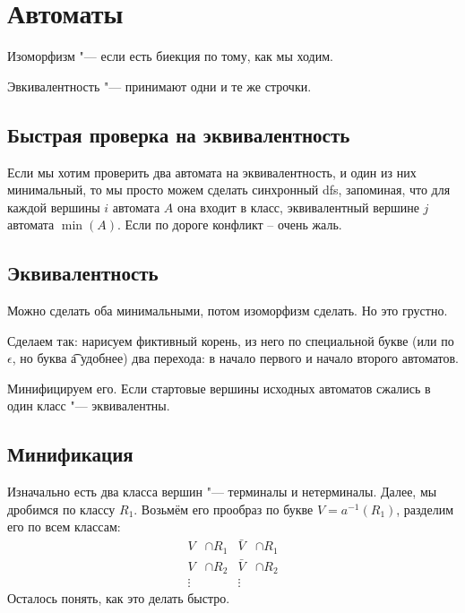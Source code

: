 \section{Автоматы}

\begin{Def}
	Изоморфизм "--- если есть биекция по тому, как мы ходим.
\end{Def}
\begin{Def}
	Эвкивалентность "--- принимают одни и те же строчки.
\end{Def}

\subsection{Быстрая проверка на эквивалентность}

Если мы хотим проверить два автомата на эквивалентность, и один из них минимальный, то мы просто можем сделать синхронный dfs, запоминая, что для каждой вершины $i$ автомата $A$ она входит в класс, эквивалентный вершине $j$ автомата $\min(A)$. Если по дороге конфликт -- очень жаль.

\subsection{Эквивалентность}

Можно сделать оба минимальными, потом изоморфизм сделать.
Но это грустно.

Сделаем так: нарисуем фиктивный корень, из него по специальной букве (или по $\epsilon$, но буква \t a удобнее) два перехода: в начало первого и начало второго автоматов.

Минифицируем его. Если стартовые вершины исходных автоматов сжались в один класс "--- эквивалентны.

\subsection{Минификация}

Изначально есть два класса вершин "--- терминалы и нетерминалы.
Далее, мы дробимся по классу $R_1$.
Возьмём его прообраз по букве $V = a^{-1}(R_1)$, разделим его по всем классам:
\begin{align*}
	V &\cap R_1 & \bar V &\cap R_1 \\
	V &\cap R_2 & \bar V &\cap R_2 \\
	\vdots && \vdots
\end{align*}
Осталось понять, как это делать быстро.

